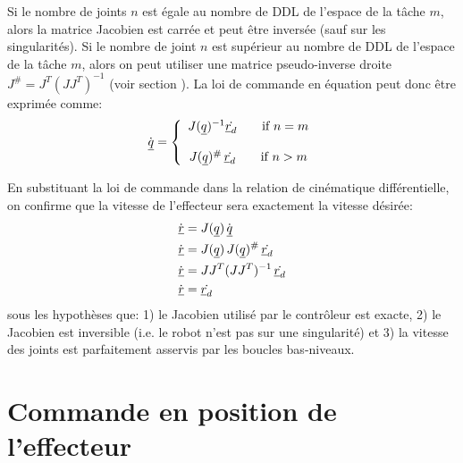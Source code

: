 Si le nombre de joints $n$ est égale au nombre de DDL de l'espace de la tâche $m$, alors la matrice Jacobien est carrée et peut être inversée (sauf sur les singularités). Si le nombre de joint $n$ est supérieur au nombre de DDL de l'espace de la tâche $m$, alors on peut utiliser une matrice pseudo-inverse droite $J^{\#} = J^T (J J^T)^{-1}$ (voir section \label{sec:pseudoinverse}). La loi de commande en équation peut donc être exprimée comme:
\begin{align}
\dot{\underline{q}} = \left\{ \begin{array}{c}
 J(\underline{q})^{-1} \dot{\underline{r}_d}   \quad\quad \text{if $n=m$}
 \\ \\
 J(\underline{q})^{\#} \, \dot{\underline{r}_d}   \quad\quad \text{if $n>m$}
\end{array}
\right.
\end{align}

En substituant la loi de commande dans la relation de cinématique différentielle, on confirme que la vitesse de l'effecteur sera exactement la vitesse désirée:
\begin{align}
\dot{\underline{r}} &= J(\underline{q}) \, \dot{\underline{q}} \\
\dot{\underline{r}} &= J(\underline{q}) \, J(\underline{q})^{\#} \, \dot{\underline{r}_d} \\
\dot{\underline{r}} &= J J^T (J J^T)^{-1} \, \dot{\underline{r}_d} \\
\dot{\underline{r}} &=  \dot{\underline{r}_d} 
\end{align}
sous les hypothèses que: 1) le Jacobien utilisé par le contrôleur est exacte, 2) le Jacobien est inversible (i.e. le robot n'est pas sur une singularité) et 3) la vitesse des joints est parfaitement asservis par les boucles bas-niveaux. 




\newpage
\section{Commande en position de l'effecteur}
\label{sec:positioncontrol}

